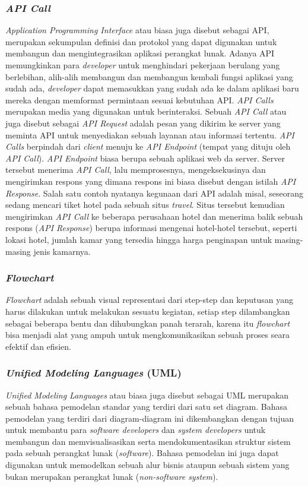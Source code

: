 \documentclass[a4paper]{article}
\newcommand{\subsubbab}[1]{%
    \subsubsection{#1}%
}
\begin{document}
\subsubbab{\textit{API Call}}
\textit{Application Programming Interface} atau biasa juga disebut sebagai API, merupakan sekumpulan definisi dan protokol yang dapat digunakan untuk membangun dan mengintegrasikan aplikasi perangkat lunak\autocite{whats-api}. Adanya API memungkinkan para \textit{developer} untuk menghindari pekerjaan berulang yang berlebihan, alih-alih membangun dan membangun kembali fungsi aplikasi yang sudah ada, \textit{developer} dapat memasukkan yang sudah ada ke dalam aplikasi baru mereka dengan memformat permintaan sesuai kebutuhan API\autocite{whats-api-2}. \textit{API Calls} merupakan media yang digunakan untuk berinteraksi. Sebuah \textit{API Call} atau juga disebut sebagai \textit{API Request} adalah pesan yang dikirim ke server yang meminta API untuk menyediakan sebuah layanan atau informasi tertentu. \textit{API Calls} berpindah dari \textit{client} menuju ke \textit{API Endpoint} (tempat yang dituju oleh \textit{API Call}). \textit{API Endpoint} biasa berupa sebuah aplikasi web da server. Server tersebut menerima \textit{API Call}, lalu memprosesnya, mengeksekusinya dan mengirimkan respons yang dimana respons ini biasa disebut dengan istilah \textit{API Response}\autocite{whats-api-call}. Salah satu contoh nyatanya kegunaan dari API adalah misal, seseorang sedang mencari tiket hotel pada sebuah situs \textit{travel}. Situs tersebut kemudian mengirimkan \textit{API Call} ke beberapa perusahaan hotel dan menerima balik sebuah respons (\textit{API Response}) berupa informasi mengenai hotel-hotel tersebut, seperti lokasi hotel, jumlah kamar yang tersedia hingga harga penginapan untuk masing-masing jenis kamarnya.

\subsubbab{\textit{Flowchart}}
\textit{Flowchart} adalah sebuah visual representasi dari step-step dan keputusan yang harus dilakukan untuk melakukan sesuatu kegiatan, setiap step dilambangkan sebagai beberapa bentu dan dihubungkan panah terarah, karena itu \textit{flowchart} bisa menjadi alat yang ampuh untuk mengkomunikasikan sebuah proses seara efektif dan efisien\autocite{smartdraw-flowchart}.

\newpage

\subsubbab{\textit{Unified Modeling Languages} (\textbf{UML})}
\textit{Unified Modeling Languages} atau biasa juga disebut sebagai UML merupakan sebuah bahasa pemodelan standar yang terdiri dari satu set diagram. Bahasa pemodelan yang terdiri dari diagram-diagram ini dikembangkan dengan tujuan untuk membantu para \textit{software developers} dan \textit{system developers} untuk membangun dan memvisualisasikan serta mendokumentasikan struktur sistem pada sebuah perangkat lunak (\textit{software}). Bahasa pemodelan ini juga dapat digunakan untuk memodelkan sebuah alur bisnis ataupun sebuah sistem yang bukan merupakan perangkat lunak (\textit{non-software system})\autocite{what-is-UML}.
\end{document}

